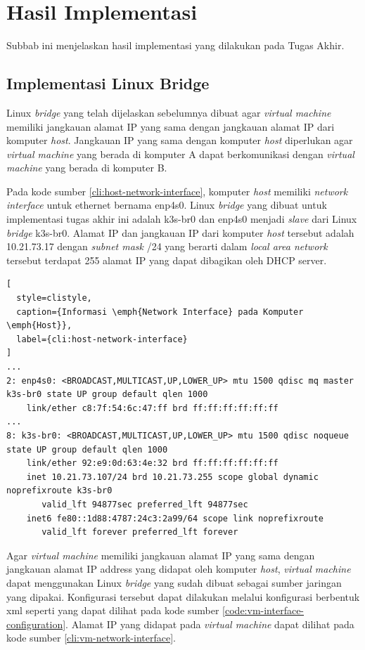 \section{Hasil Implementasi}
\label{sec:hasil-implementasi}

Subbab ini menjelaskan hasil implementasi yang dilakukan pada
Tugas Akhir.

\subsection{Implementasi Linux Bridge}
\label{subsec:implementasi-linux-bridge}

Linux \emph{bridge} yang telah dijelaskan sebelumnya dibuat
agar \emph{virtual machine} memiliki jangkauan alamat IP yang sama
dengan jangkauan alamat IP dari komputer \emph{host}. Jangkauan IP yang
sama dengan komputer \emph{host} diperlukan agar \emph{virtual machine}
yang berada di komputer A dapat berkomunikasi dengan \emph{virtual machine}
yang berada di komputer B.

Pada kode sumber \ref{cli:host-network-interface}, komputer \emph{host} memiliki
\emph{network interface} untuk ethernet bernama enp4s0. Linux \emph{bridge} yang
dibuat untuk implementasi tugas akhir ini adalah k3s-br0 dan enp4s0 menjadi
\emph{slave} dari Linux \emph{bridge} k3s-br0. Alamat IP dan jangkauan IP dari
komputer \emph{host} tersebut adalah 10.21.73.17 dengan \emph{subnet mask} /24
yang berarti dalam \emph{local area network} tersebut terdapat 255 alamat
IP yang dapat dibagikan oleh DHCP server.

{\renewcommand{\lstlistingname}{Instruksi Terminal}
\begin{lstlisting}[
  style=clistyle,
  caption={Informasi \emph{Network Interface} pada Komputer \emph{Host}},
  label={cli:host-network-interface}
]
...
2: enp4s0: <BROADCAST,MULTICAST,UP,LOWER_UP> mtu 1500 qdisc mq master k3s-br0 state UP group default qlen 1000
    link/ether c8:7f:54:6c:47:ff brd ff:ff:ff:ff:ff:ff
...
8: k3s-br0: <BROADCAST,MULTICAST,UP,LOWER_UP> mtu 1500 qdisc noqueue state UP group default qlen 1000
    link/ether 92:e9:0d:63:4e:32 brd ff:ff:ff:ff:ff:ff
    inet 10.21.73.107/24 brd 10.21.73.255 scope global dynamic noprefixroute k3s-br0
       valid_lft 94877sec preferred_lft 94877sec
    inet6 fe80::1d88:4787:24c3:2a99/64 scope link noprefixroute
       valid_lft forever preferred_lft forever
\end{lstlisting}
}

Agar \emph{virtual machine} memiliki jangkauan alamat IP yang sama dengan 
jangkauan alamat IP address yang didapat oleh komputer \emph{host}, \emph{virtual machine}
dapat menggunakan Linux \emph{bridge} yang sudah dibuat sebagai sumber jaringan
yang dipakai. Konfigurasi tersebut dapat dilakukan melalui konfigurasi berbentuk
xml seperti yang dapat dilihat pada kode sumber \ref{code:vm-interface-configuration}.
Alamat IP yang didapat pada \emph{virtual machine} dapat dilihat pada kode
sumber \ref{cli:vm-network-interface}.

